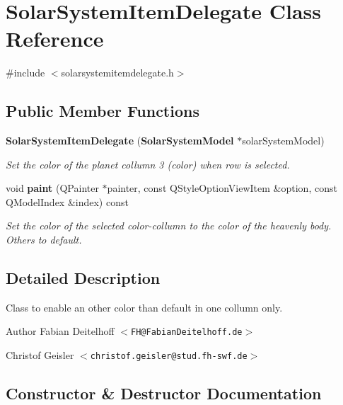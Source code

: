 \section{\-Solar\-System\-Item\-Delegate \-Class \-Reference}
\label{df/dae/classSolarSystemItemDelegate}


{\ttfamily \#include $<$solarsystemitemdelegate.\-h$>$}

\subsection*{\-Public \-Member \-Functions}
\begin{DoxyCompactItemize}
\item 
{\bf \-Solar\-System\-Item\-Delegate} ({\bf \-Solar\-System\-Model} $\ast$solar\-System\-Model)
\begin{DoxyCompactList}\small\item\em \-Set the color of the planet collumn 3 (color) when row is selected. \end{DoxyCompactList}\item 
void {\bf paint} (\-Q\-Painter $\ast$painter, const \-Q\-Style\-Option\-View\-Item \&option, const \-Q\-Model\-Index \&index) const 
\begin{DoxyCompactList}\small\item\em \-Set the color of the selected color-\/collumn to the color of the heavenly body. \-Others to default. \end{DoxyCompactList}\end{DoxyCompactItemize}


\subsection{\-Detailed \-Description}
\-Class to enable an other color than default in one collumn only.

\begin{DoxyAuthor}{\-Author}
\-Fabian \-Deitelhoff $<${\tt \-F\-H@\-Fabian\-Deitelhoff.\-de}$>$ 

\-Christof \-Geisler $<${\tt christof.\-geisler@stud.\-fh-\/swf.\-de}$>$ 
\end{DoxyAuthor}


\subsection{\-Constructor \& \-Destructor \-Documentation}
